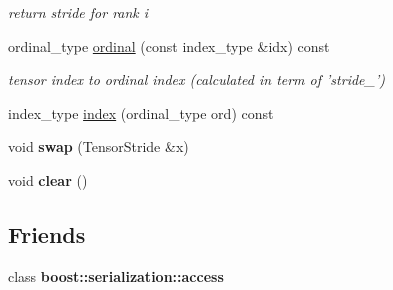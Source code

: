 \begin{DoxyCompactItemize}
\begin{DoxyCompactList}\small\item\em return stride for rank i \item\end{DoxyCompactList}\item 
\hypertarget{classbtas_1_1_tensor_stride_3_01_n_00_01_cblas_row_major_00_01_t__ext_00_01_t__str_00_01_t__idx_01_4_a0bf8256d8415efffc57153f0a74dd089}{
ordinal\_\-type \hyperlink{classbtas_1_1_tensor_stride_3_01_n_00_01_cblas_row_major_00_01_t__ext_00_01_t__str_00_01_t__idx_01_4_a0bf8256d8415efffc57153f0a74dd089}{ordinal} (const index\_\-type \&idx) const }
\label{classbtas_1_1_tensor_stride_3_01_n_00_01_cblas_row_major_00_01_t__ext_00_01_t__str_00_01_t__idx_01_4_a0bf8256d8415efffc57153f0a74dd089}

\begin{DoxyCompactList}\small\item\em tensor index to ordinal index (calculated in term of 'stride\_\-') \item\end{DoxyCompactList}\item 
index\_\-type \hyperlink{classbtas_1_1_tensor_stride_3_01_n_00_01_cblas_row_major_00_01_t__ext_00_01_t__str_00_01_t__idx_01_4_a5f38213dbaba5c46ce528337ca77ce03}{index} (ordinal\_\-type ord) const 
\item 
\hypertarget{classbtas_1_1_tensor_stride_3_01_n_00_01_cblas_row_major_00_01_t__ext_00_01_t__str_00_01_t__idx_01_4_a75fc3555cdfa9d496a5d13624aea1fb7}{
void {\bfseries swap} (TensorStride \&x)}
\label{classbtas_1_1_tensor_stride_3_01_n_00_01_cblas_row_major_00_01_t__ext_00_01_t__str_00_01_t__idx_01_4_a75fc3555cdfa9d496a5d13624aea1fb7}

\item 
\hypertarget{classbtas_1_1_tensor_stride_3_01_n_00_01_cblas_row_major_00_01_t__ext_00_01_t__str_00_01_t__idx_01_4_a88ddf75f78b16da3b3307a5306cc1112}{
void {\bfseries clear} ()}
\label{classbtas_1_1_tensor_stride_3_01_n_00_01_cblas_row_major_00_01_t__ext_00_01_t__str_00_01_t__idx_01_4_a88ddf75f78b16da3b3307a5306cc1112}

\end{DoxyCompactItemize}
\subsection*{Friends}
\begin{DoxyCompactItemize}
\item 
\hypertarget{classbtas_1_1_tensor_stride_3_01_n_00_01_cblas_row_major_00_01_t__ext_00_01_t__str_00_01_t__idx_01_4_ac98d07dd8f7b70e16ccb9a01abf56b9c}{
class {\bfseries boost::serialization::access}}
\label{classbtas_1_1_tensor_stride_3_01_n_00_01_cblas_row_major_00_01_t__ext_00_01_t__str_00_01_t__idx_01_4_ac98d07dd8f7b70e16ccb9a01abf56b9c}

\end{DoxyCompactItemize}
